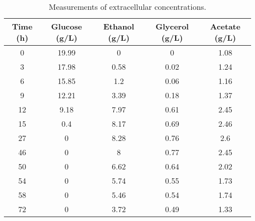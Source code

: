 \begin{table}[H]
\caption[Measurements of extracellular concentrations]{Measurements of extracellular concentrations.}
\begin{center}
\begin{tabular}{ccccc}
  \textbf{Time (h)} & \textbf{Glucose (g/L)} & \textbf{Ethanol (g/L)} & \textbf{Glycerol (g/L)} & \textbf{Acetate (g/L)} \\
    \hline
  0                 & 19.99            & 0                & 0                 & 1.08             \\
  3                 & 17.98            & 0.58             & 0.02              & 1.24             \\
  6                 & 15.85            & 1.2              & 0.06              & 1.16             \\
  9                 & 12.21            & 3.39             & 0.18              & 1.37             \\
  12                & 9.18             & 7.97             & 0.61              & 2.45             \\
  15                & 0.4              & 8.17             & 0.69              & 2.46             \\
  27                & 0                & 8.28             & 0.76              & 2.6              \\
  46                & 0                & 8                & 0.77              & 2.45             \\
  50                & 0                & 6.62             & 0.64              & 2.02             \\
  54                & 0                & 5.74             & 0.55              & 1.73             \\
  58                & 0                & 5.46             & 0.54              & 1.74             \\
  72                & 0                & 3.72             & 0.49              & 1.33
\end{tabular}
\label{table:experimental_data}
\end{center}
\end{table}
